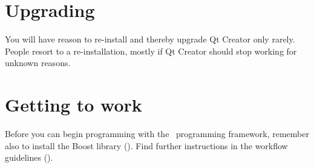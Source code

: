 \section{Upgrading}
You will have reason to re-install and thereby upgrade Qt Creator only rarely. People resort to a re-installation, mostly if Qt Creator should stop working for unknown reasons.

\section{Getting to work}
Before you can begin programming with the \US\ programming framework, remember also to install the Boost library (). Find further instructions in the workflow guidelines ().

